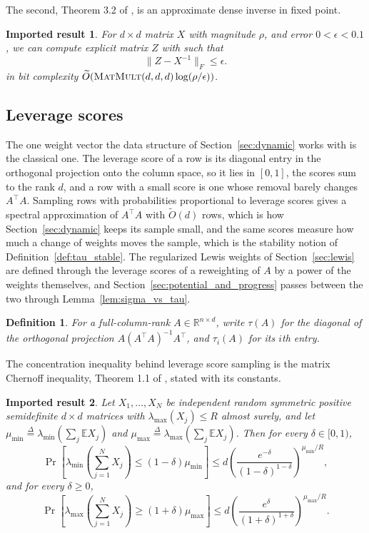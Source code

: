 \documentclass[11pt]{article}
\newtheorem{definition}{Definition}[section]
\newtheorem{importedresult}{Imported result}[section]
\newcommand{\R}{\mathbb R}
\newcommand{\MM}{\textsc{MatMult}}
\renewcommand{\O}{\widetilde O}
\newcommand{\defeq}{\stackrel{\Delta}{=}}
\newcommand{\E}{\mathbb E}
\begin{document}
The second, Theorem 3.2 of \cite{GPV23}, is an approximate
dense inverse in fixed point.

\begin{importedresult}
\label{imp:denseinverse}
For $d \times d$ matrix
$X$ with magnitude
$\rho$, and error
$0 < \epsilon < 0.1$, we can compute explicit matrix
$Z$ with such that
\[
\|Z-X^{-1}\|_F \le \epsilon.
\]
in bit complexity $\O(\MM(d,d,d) \log(\rho/\epsilon))$.
\end{importedresult}

\subsection{Leverage scores}
\label{subsec:leverage}

The one weight vector the data structure of Section~\ref{sec:dynamic} works with
is the classical one.
The leverage score of a row is its diagonal entry in the orthogonal projection
onto the column space, so it lies in $[0, 1]$, the scores sum to the rank
$d$, and a row with a small score is one whose removal barely changes
$A^\top A$.
Sampling rows with probabilities proportional to leverage scores gives a
spectral approximation of $A^\top A$ with
$\O(d)$ rows, which is how Section~\ref{sec:dynamic} keeps its sample small, and
the same scores measure how much a change of weights moves the sample, which is
the stability notion of Definition~\ref{def:tau_stable}.
The regularized Lewis weights of Section~\ref{sec:lewis} are defined through the
leverage scores of a reweighting of $A$ by a power of the weights themselves,
and Section~\ref{sec:potential_and_progress} passes between the two through
Lemma~\ref{lem:sigma_vs_tau}.

\begin{definition}
For a full-column-rank $A\in\R^{n \times d}$, write
$\tau(A)$ for the diagonal of the orthogonal projection
$A(A^\top A)^{-1}A^\top$, and
$\tau_i(A)$ for its
$i$th entry.
\end{definition}

The concentration inequality behind leverage score sampling is the matrix
Chernoff inequality, Theorem 1.1 of \cite{T12:journal}, stated with its
constants.

\begin{importedresult}
\label{imp:matrix_chernoff}
Let $X_1, \ldots, X_N$ be independent random symmetric positive semidefinite
$d \times d$ matrices with
$\lambda_{\max}(X_j) \le R$ almost surely, and let
$\mu_{\min} \defeq \lambda_{\min}(\sum_j \E X_j)$ and
$\mu_{\max} \defeq \lambda_{\max}(\sum_j \E X_j)$.
Then for every $\delta \in [0, 1)$,
\[
\Pr\left[ \lambda_{\min}\left( \sum_{j = 1}^{N} X_j \right)
\le (1 - \delta) \mu_{\min} \right]
\le
d \left( \frac{e^{-\delta}}{(1 - \delta)^{1 - \delta}}
\right)^{\mu_{\min} / R} ,
\]
and for every $\delta \ge 0$,
\[
\Pr\left[ \lambda_{\max}\left( \sum_{j = 1}^{N} X_j \right)
\ge (1 + \delta) \mu_{\max} \right]
\le
d \left( \frac{e^{\delta}}{(1 + \delta)^{1 + \delta}}
\right)^{\mu_{\max} / R} .
\]
\end{importedresult}
\end{document}
